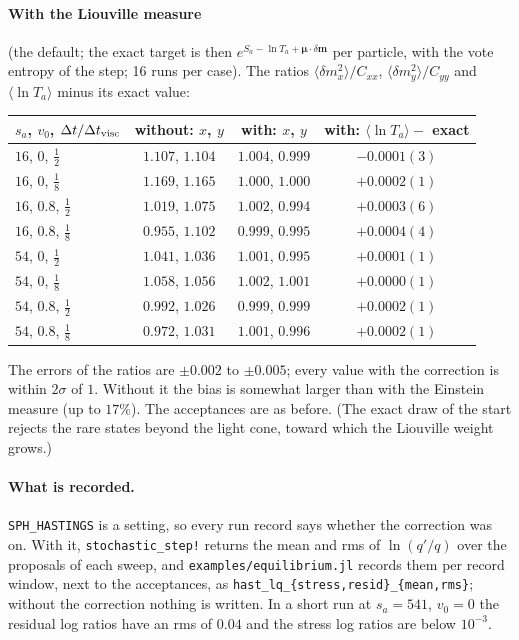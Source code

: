 \documentclass[11pt,aps,preprint,nofootinbib,superscriptaddress,tightenlines]{revtex4-2}
\let\oldparagraph\paragraph
\renewcommand{\paragraph}{\par\bigskip\oldparagraph}
\begin{document}
\paragraph{With the Liouville measure} (the default; the exact target is then $e^{S_a-\ln T_a+\bm\mu\cdot\delta\bm m}$ per particle, with the vote entropy of the
step; 16 runs per case).  The ratios $\langle\delta m_x^2\rangle/C_{xx}$, $\langle\delta m_y^2\rangle/C_{yy}$ and $\langle\ln T_a\rangle$ minus its exact value:
\begin{center}
\begin{tabular}{lccc}
\hline
$s_a$, $v_0$, $\Delta t/\Delta t_{\rm visc}$ & without: $x$, $y$ & with: $x$, $y$ & with: $\langle\ln T_a\rangle-$ exact \\ \hline
$16$, $0$, $\frac12$   & $1.107$, $1.104$ & $1.004$, $0.999$ & $-0.0001(3)$ \\
$16$, $0$, $\frac18$   & $1.169$, $1.165$ & $1.000$, $1.000$ & $+0.0002(1)$ \\
$16$, $0.8$, $\frac12$ & $1.019$, $1.075$ & $1.002$, $0.994$ & $+0.0003(6)$ \\
$16$, $0.8$, $\frac18$ & $0.955$, $1.102$ & $0.999$, $0.995$ & $+0.0004(4)$ \\
$54$, $0$, $\frac12$   & $1.041$, $1.036$ & $1.001$, $0.995$ & $+0.0001(1)$ \\
$54$, $0$, $\frac18$   & $1.058$, $1.056$ & $1.002$, $1.001$ & $+0.0000(1)$ \\
$54$, $0.8$, $\frac12$ & $0.992$, $1.026$ & $0.999$, $0.999$ & $+0.0002(1)$ \\
$54$, $0.8$, $\frac18$ & $0.972$, $1.031$ & $1.001$, $0.996$ & $+0.0002(1)$ \\
\hline
\end{tabular}
\end{center}
The errors of the ratios are $\pm0.002$ to $\pm0.005$; every value with the correction is within $2\sigma$ of $1$.  Without it the bias is somewhat
larger than with the Einstein measure (up to $17\%$).  The acceptances are as before.  (The exact draw of the start rejects the rare states
beyond the light cone, toward which the Liouville weight grows.)

\paragraph{What is recorded.}  \texttt{SPH\_HASTINGS} is a setting, so every run record says whether the correction was on.  With it,
\texttt{stochastic\_step!} returns the mean and rms of $\ln(q'/q)$ over the proposals of each sweep, and \texttt{examples/equilibrium.jl} records them
per record window, next to the acceptances, as \texttt{hast\_lq\_\{stress,resid\}\_\{mean,rms\}}; without the correction nothing is written.  In a short run
at $s_a=541$, $v_0=0$ the residual log ratios have an rms of $0.04$ and the stress log ratios are below $10^{-3}$.
\end{document}
